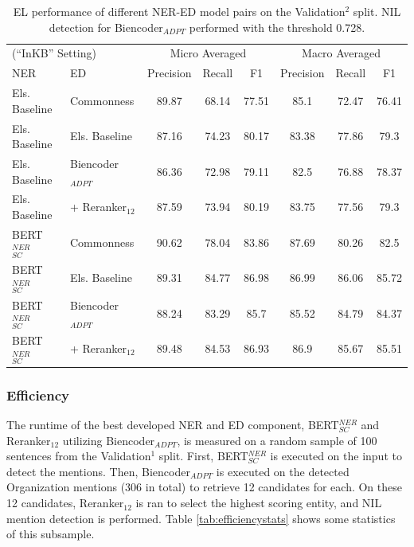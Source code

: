\documentclass{report}
\theoremstyle{definition}
\theoremstyle{remark}
\begin{document}
\begin{table}[H]
    \vspace{0.5cm}\begin{tabular}{l l c c c| c c c}
    \multicolumn{2}{l}{(``InKB'' Setting)}&\multicolumn{3}{c|}{Micro Averaged}&\multicolumn{3}{c}{Macro Averaged} \\
    NER & ED &Precision&Recall&F1&Precision&Recall&F1\\
    \hline
    Els. Baseline & Commonness & 89.87	&68.14&	77.51&	85.1	&72.47&	76.41\\
    Els. Baseline & Els. Baseline & 87.16	&74.23&	80.17	&83.38	&77.86&	79.3\\
    Els. Baseline & Biencoder$_{ADPT}$ &86.36	&72.98&	79.11&	82.5	&76.88&	78.37\\
    Els. Baseline  & + Reranker$_{12}$ &87.59&73.94&80.19&83.75&77.56&79.3\\ 
    BERT$_{SC}^{NER}$ & Commonness & 90.62	&78.04&	83.86	&87.69	&80.26&	82.5\\
    BERT$_{SC}^{NER}$ & Els. Baseline & 89.31	&84.77&	86.98	&86.99	&86.06&	85.72\\
    BERT$_{SC}^{NER}$ & Biencoder$_{ADPT}$ &88.24	&83.29&	85.7	&85.52	&84.79&	84.37\\
    BERT$_{SC}^{NER}$ & + Reranker$_{12}$ &89.48&84.53&86.93&86.9&85.67&85.51\\
    \end{tabular}
    \caption{EL performance of different NER-ED model pairs on the Validation$^2$ split. NIL detection for Biencoder$_{ADPT}$ performed with the threshold 0.728.}
    \label{tab:elresultsvalid}
\end{table}






\subsubsection{Efficiency}
The runtime of the best developed NER and ED component, BERT$_{SC}^{NER}$ and Reranker$_{12}$ utilizing Biencoder$_{ADPT}$, is measured on a random sample of 100 sentences from the Validation$^1$ split. First, BERT$_{SC}^{NER}$ is executed on the input to detect the mentions. Then, Biencoder$_{ADPT}$ is executed on the detected Organization mentions (306 in total) to retrieve 12 candidates for each. On these 12 candidates, Reranker$_{12}$ is ran to select the highest scoring entity, and NIL mention detection is performed. Table \ref{tab:efficiencystats} shows some statistics of this subsample.
\end{document}
